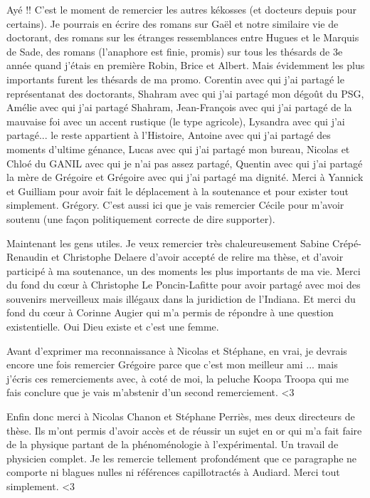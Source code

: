 Ayé !! C'est le moment de remercier les autres kékosses (et docteurs depuis pour certains). Je pourrais en écrire des romans sur Gaël et notre similaire vie de doctorant, des romans sur les étranges ressemblances entre Hugues et le Marquis de Sade, des romans (l'anaphore est finie, promis) sur tous les thésards de 3e année quand j'étais en première Robin, Brice et Albert. Mais évidemment les plus importants furent les thésards de ma promo. Corentin avec qui j'ai partagé le représentanat des doctorants, Shahram avec qui j'ai partagé mon dégoût du PSG, Amélie avec qui j'ai partagé Shahram, Jean-François avec qui j'ai partagé de la mauvaise foi avec un accent rustique (le type agricole), Lysandra avec qui j'ai partagé... le reste appartient à l'Histoire, Antoine avec qui j'ai partagé des moments d'ultime génance, Lucas avec qui j'ai partagé mon bureau, Nicolas et Chloé du GANIL avec qui je n'ai pas assez partagé, Quentin avec qui j'ai partagé la mère de Grégoire et Grégoire avec qui j'ai partagé ma dignité.
Merci à Yannick et Guilliam pour avoir fait le déplacement à la soutenance et pour exister tout simplement. Grégory.
 C'est aussi ici que je vais remercier Cécile pour m'avoir soutenu (une façon politiquement correcte de dire supporter). 
\newline

Maintenant les gens utiles.
Je veux remercier très chaleureusement Sabine Crépé-Renaudin et Christophe Delaere d'avoir accepté de relire ma thèse, et d'avoir participé à ma soutenance, un des moments les plus importants de ma vie. Merci du fond du cœur à Christophe Le Poncin-Lafitte pour avoir partagé avec moi des souvenirs merveilleux mais illégaux dans la juridiction de l'Indiana. Et merci du fond du cœur à Corinne Augier qui m'a permis de répondre à une question existentielle. Oui Dieu existe et c'est une femme. 
\newline

Avant d'exprimer ma reconnaissance à Nicolas et Stéphane, en vrai, je devrais encore une fois remercier Grégoire parce que c'est mon meilleur ami ... mais j'écris ces remerciements avec, à coté de moi, la peluche Koopa Troopa qui me fais conclure que je vais m'abstenir d'un second remerciement. <3
\newline

Enfin donc merci à Nicolas Chanon et Stéphane Perriès, mes deux directeurs de thèse. Ils m'ont permis d'avoir accès et de réussir un sujet en or qui m'a fait faire de la physique partant de la phénoménologie à l'expérimental. Un travail de physicien complet. Je les remercie tellement profondément que ce paragraphe ne comporte ni blagues nulles ni références capillotractés à Audiard. Merci tout simplement. <3
\newline


\endgroup
